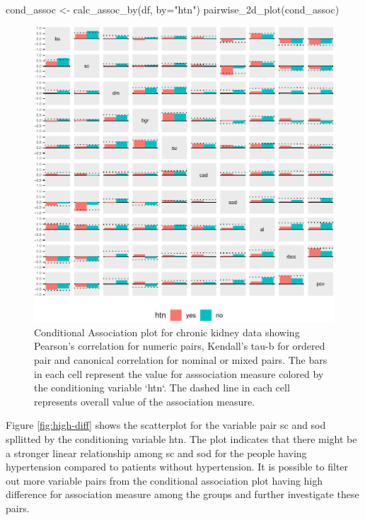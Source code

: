 \begin{Schunk}
\begin{Sinput}
cond_assoc <- calc_assoc_by(df, by="htn")
pairwise_2d_plot(cond_assoc)
\end{Sinput}
\begin{figure}

{\centering \includegraphics{rj_paper_files/figure-latex/cond-assoc-1} 

}

\caption[Conditional Association plot for chronic kidney data showing Pearson's correlation for numeric pairs, Kendall's tau-b for ordered pair and canonical correlation for nominal or mixed pairs]{Conditional Association plot for chronic kidney data showing Pearson's correlation for numeric pairs, Kendall's tau-b for ordered pair and canonical correlation for nominal or mixed pairs. The bars in each cell represent the value for asssociation measure colored by the conditioning variable `htn`. The dashed line in each cell represents overall value of the association measure.}\label{fig:cond-assoc}
\end{figure}
\end{Schunk}

Figure \ref{fig:high-diff} shows the scatterplot for the variable pair
sc and sod spllitted by the conditioning variable htn. The plot
indicates that there might be a stronger linear relationship among sc
and sod for the people having hypertension compared to patients without
hypertension. It is possible to filter out more variable pairs from the
conditional association plot having high difference for association
measure among the groups and further investigate these pairs.

